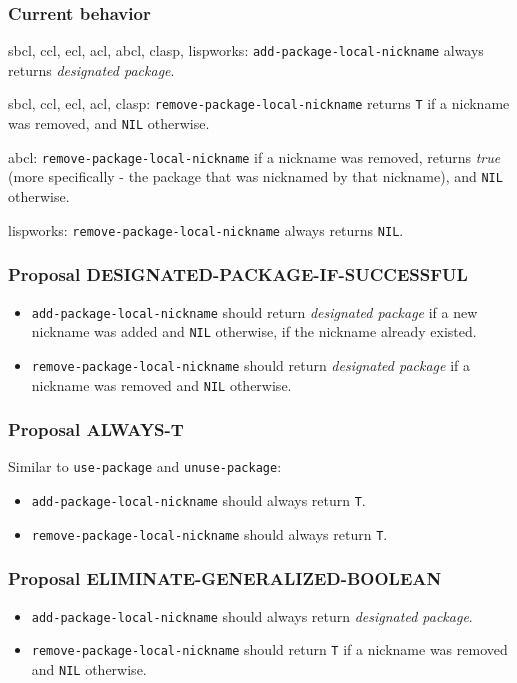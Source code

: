 \documentclass[11pt]{article}
\begin{document}
\subsubsection{Current behavior}
\label{sec:org914edef}
sbcl, ccl, ecl, acl, abcl, clasp, lispworks:
  \texttt{add-package-local-nickname} always returns \emph{designated package}.

sbcl, ccl, ecl, acl, clasp:
  \texttt{remove-package-local-nickname} returns \texttt{T} if a nickname was removed,
  and \texttt{NIL} otherwise.

abcl:
  \texttt{remove-package-local-nickname} if a nickname was removed, returns \emph{true} (more
  specifically - the package that was nicknamed by that nickname), and \texttt{NIL}
  otherwise.

lispworks:
  \texttt{remove-package-local-nickname} always returns \texttt{NIL}.
\subsubsection{Proposal DESIGNATED-PACKAGE-IF-SUCCESSFUL}
\label{sec:orgae85eea}
\begin{itemize}
\item \texttt{add-package-local-nickname} should return \emph{designated package} if a new nickname
was added and \texttt{NIL} otherwise, if the nickname already existed.
\item \texttt{remove-package-local-nickname} should return \emph{designated package} if a nickname
was removed and \texttt{NIL} otherwise.
\end{itemize}
\subsubsection{Proposal ALWAYS-T}
\label{sec:orgb7bbc23}
Similar to \texttt{use-package} and \texttt{unuse-package}:
\begin{itemize}
\item \texttt{add-package-local-nickname} should always return \texttt{T}.
\item \texttt{remove-package-local-nickname} should always return \texttt{T}.
\end{itemize}
\subsubsection{Proposal ELIMINATE-GENERALIZED-BOOLEAN}
\label{sec:orgbfbe9ff}
\begin{itemize}
\item \texttt{add-package-local-nickname} should always return \emph{designated package}.
\item \texttt{remove-package-local-nickname} should return \texttt{T} if a nickname was removed and
\texttt{NIL} otherwise.
\end{itemize}
\end{document}
